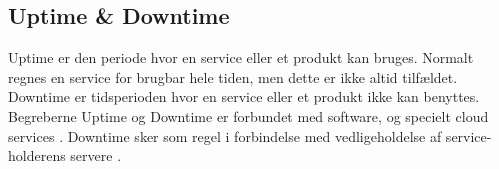 \subsection{Uptime \& Downtime}
Uptime er den periode hvor en service eller et produkt kan bruges. Normalt regnes en service for brugbar hele tiden, men dette er ikke altid tilfældet. Downtime er tidsperioden hvor en service eller et produkt ikke kan benyttes. Begreberne Uptime og Downtime er forbundet med software, og specielt cloud services \citep{drpbx_downtime, UpDown}. Downtime sker som regel i forbindelse med vedligeholdelse af service-holderens servere \citep{drpbx_downtime}.